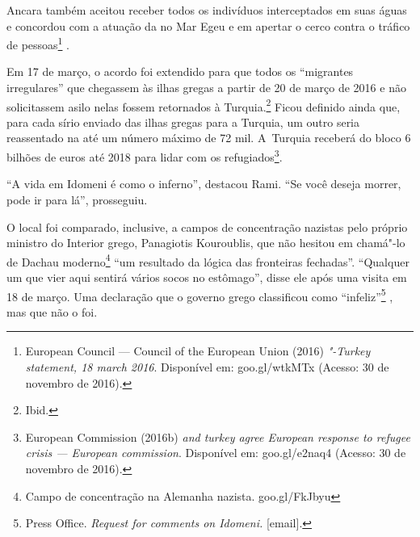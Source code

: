 Ancara também aceitou receber todos os indivíduos interceptados em suas águas e concordou com a
atuação da  no Mar Egeu e em apertar o cerco contra o tráfico de
pessoas\footnote{ European Council --- Council of the European Union
(2016) \emph{"-Turkey statement, 18 march 2016}. Disponível em:
goo.gl/wtkMTx
(Acesso: 30 de novembro de 2016).} .

% 
% 
Em 17 de março, o acordo foi extendido para que todos os ``migrantes
irregulares'' que chegassem às ilhas gregas a partir de 20 de março de
2016 e não solicitassem asilo nelas fossem retornados à
Turquia.\footnote{ Ibid.}  Ficou definido ainda que, para cada sírio
enviado das ilhas gregas para a Turquia, um outro seria reassentado na
 até um número máximo de 72 mil. A~Turquia receberá do bloco 6 bilhões
de euros até 2018 para lidar com os refugiados\footnote{ European Commission (2016b) \emph{ and turkey agree
European response to refugee crisis --- European commission}. Disponível
em: goo.gl/e2naq4
(Acesso: 30 de
novembro de 2016).}.

``A vida em Idomeni é como o inferno'', destacou Rami. ``Se você deseja
morrer, pode ir para lá'', prosseguiu.

O local foi comparado, inclusive, a campos de concentração nazistas pelo próprio
ministro do Interior grego, Panagiotis Kouroublis, que não hesitou em
chamá"-lo de Dachau moderno\footnote{ Campo de concentração na Alemanha nazista.  goo.gl/FkJbyu }
 ``um resultado da
lógica das fronteiras fechadas''. ``Qualquer um que vier aqui sentirá
vários socos no estômago'', disse ele após uma visita em 18 de março.
Uma declaração que o governo grego classificou como
``infeliz''\footnote{ Press Office. \emph{Request for comments on
Idomeni}\emph{.} {[}email{]}.} , mas que não o foi.

